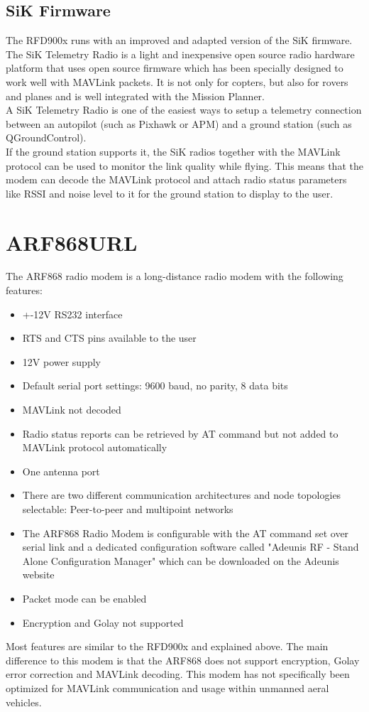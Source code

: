 \subsection{SiK Firmware}
The RFD900x runs with an improved and adapted version of the SiK firmware.\\
The SiK Telemetry Radio is a light and inexpensive open source radio hardware platform that uses open source firmware which has been specially designed to work well with MAVLink packets. It is not only for copters, but also for rovers and planes and is well integrated with the Mission Planner.\\
A SiK Telemetry Radio is one of the easiest ways to setup a telemetry connection between an autopilot (such as Pixhawk or APM) and a ground station (such as QGroundControl).\\
If the ground station supports it, the SiK radios together with the MAVLink protocol can be used to monitor the link quality while flying. This means that the modem can decode the MAVLink protocol and attach radio status parameters like RSSI and noise level to it for the ground station to display to the user.
%
%
%
%
%
%
\section{ARF868URL}
The ARF868 radio modem is a long-distance radio modem with the following features: \begin{itemize}
    \item +-12V RS232 interface
    \item RTS and CTS pins available to the user
    \item 12V power supply
    \item Default serial port settings: 9600 baud, no parity, 8 data bits
    \item MAVLink not decoded
    \item Radio status reports can be retrieved by AT command but not added to MAVLink protocol automatically
    \item One antenna port
    \item There are two different communication architectures and node topologies selectable: Peer-to-peer and multipoint networks
    \item The ARF868 Radio Modem is configurable with the AT command set over serial link and a dedicated configuration software called "Adeunis RF - Stand Alone Configuration Manager" which can be downloaded on the Adeunis website
    \item Packet mode can be enabled
    \item Encryption and Golay not supported
\end{itemize}
Most features are similar to the RFD900x and explained above. The main difference to this modem is that the ARF868 does not support encryption, Golay error correction and MAVLink decoding. This modem has not specifically been optimized for MAVLink communication and usage within unmanned aeral vehicles.\\
%
%
